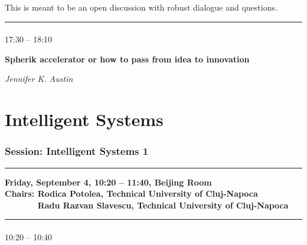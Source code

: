 This is meant to be an open discussion with robust dialogue and questions.


\noindent\rule{\textwidth}{0.4pt} \nopagebreak

\vspace*{-36pt}\subsection[ 
    	   {\bf Spherik accelerator or how to pass from idea to innovation
           } \\
           {\it Jennifer K. Austin
           }
	]
	    {
            }
	    17:30 -- 18:10 \nopagebreak

	    {\bf Spherik accelerator or how to pass from idea to innovation} \nopagebreak

	    {\it Jennifer K. Austin} \nopagebreak    
	    \\


\part{Intelligent Systems}

\section{{\bf \large Session: 
Intelligent Systems 1
}}\vspace{-15pt}


\noindent\rule{\textwidth}{0.4pt} \nopagebreak
{\bf  
Friday, September 4, 10:20 -- 11:40, Beijing Room
} \\ \nopagebreak
{\bf  Chairs: 
Rodica Potolea, Technical University of Cluj-Napoca
} \\ \nopagebreak
{\bf  \textcolor{white}{Chairs:} 
Radu Razvan Slavescu, Technical University of Cluj-Napoca
} %
\noindent\rule{\textwidth}{0.4pt} \nopagebreak

\vspace*{-36pt}
    \subsection[ 
    	   {\bf Association Rules Mining with Categories and Regular Expressions based Pruning
           } \\
           {\it Radu Razvan Slavescu, Raul Alexandru Persa, Kinga Cristina Slavescu, Tibor Wekerle
           }
	]
	    {
            }
	    {\small 10:20 -- 10:40} \nopagebreak
	    



